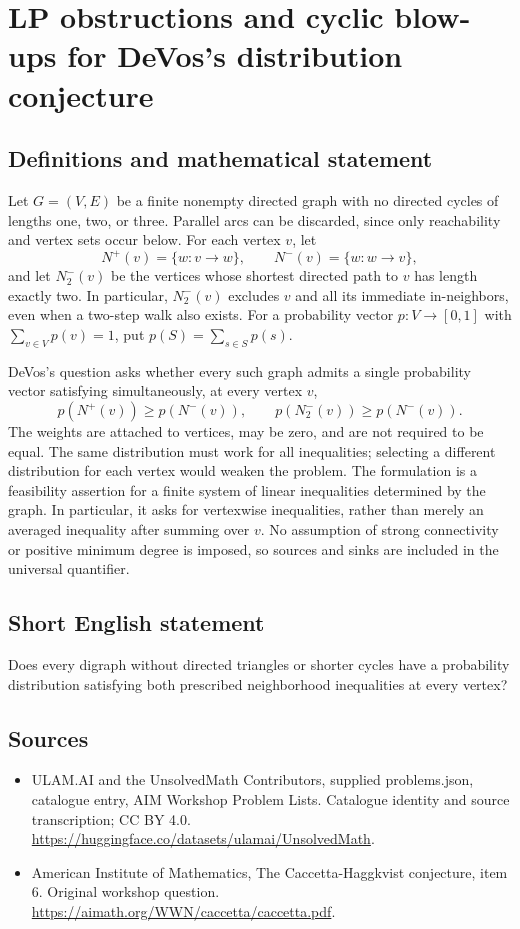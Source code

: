 \documentclass[11pt,a4paper]{article}
\begin{document}
\section*{LP obstructions and cyclic blow-ups for DeVos's distribution conjecture}\label{statement}

\subsection{Definitions and mathematical statement}
Let $G=(V,E)$ be a finite nonempty directed graph with no directed cycles of lengths one, two, or three.
Parallel arcs can be discarded, since only reachability and vertex sets occur below.
For each vertex $v$, let
\[
 N^+(v)=\{w:v\to w\},\qquad N^-(v)=\{w:w\to v\},
\]
and let $N^-_2(v)$ be the vertices whose shortest directed path to $v$ has length exactly two.
In particular, $N^-_2(v)$ excludes $v$ and all its immediate in-neighbors, even when a two-step walk also exists.
For a probability vector $p:V\to[0,1]$ with $\sum_{v\in V}p(v)=1$, put $p(S)=\sum_{s\in S}p(s)$.

DeVos's question asks whether every such graph admits a single probability vector satisfying simultaneously, at every vertex $v$,
\[
 p(N^+(v))\geq p(N^-(v)),\qquad
 p(N^-_2(v))\geq p(N^-(v)).
\]
The weights are attached to vertices, may be zero, and are not required to be equal.
The same distribution must work for all inequalities; selecting a different distribution for each vertex would weaken the problem.
The formulation is a feasibility assertion for a finite system of linear inequalities determined by the graph.
In particular, it asks for vertexwise inequalities, rather than merely an averaged inequality after summing over $v$.
No assumption of strong connectivity or positive minimum degree is imposed, so sources and sinks are included in the universal quantifier.
\subsection{Short English statement}
Does every digraph without directed triangles or shorter cycles have a probability distribution satisfying both prescribed neighborhood inequalities at every vertex?
\subsection{Sources}
\begin{itemize}
\item[S1] ULAM.AI and the UnsolvedMath Contributors, supplied problems.json, catalogue entry, AIM Workshop Problem Lists. Catalogue identity and source transcription; CC BY 4.0.
\url{https://huggingface.co/datasets/ulamai/UnsolvedMath}.
\item[S2] American Institute of Mathematics, The Caccetta-Haggkvist conjecture, item 6. Original workshop question.
\url{https://aimath.org/WWN/caccetta/caccetta.pdf}.
\end{itemize}
\end{document}

